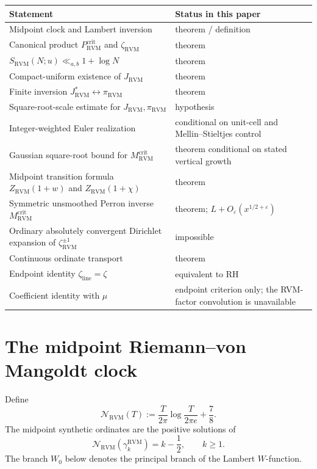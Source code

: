 \documentclass[11pt,reqno]{amsart}
\theoremstyle{definition}
\theoremstyle{remark}
\newcommand{\RVM}{\mathrm{RVM}}
\newcommand{\crit}{\mathrm{crit}}
\newcommand{\linez}{\mathrm{line}}
\begin{document}
\begin{center}
\begin{tabular}{p{}p{}}
\toprule
Statement & Status in this paper\\
\midrule
Midpoint clock and Lambert inversion & theorem / definition\\
Canonical product $P_{\RVM}^{\crit}$ and $\zeta_{\RVM}$ & theorem\\
$S_{\RVM}(N;u)\ll_{a,b}1+\log N$ & theorem\\
Compact-uniform existence of $J_{\RVM}$ & theorem\\
Finite inversion $J_{\RVM}^{*}\leftrightarrow\pi_{\RVM}$ & theorem\\
Square-root-scale estimate for $J_{\RVM},\pi_{\RVM}$ & hypothesis\\
Integer-weighted Euler realization & conditional on unit-cell and Mellin--Stieltjes control\\
Gaussian square-root bound for $M_{\RVM}^{\crit}$ & theorem conditional on stated vertical growth\\
Midpoint transition formula $Z_{\RVM}(1+w)$ and $Z_{\RVM}(1+\chi)$ & theorem\\
Symmetric unsmoothed Perron inverse $M_{\RVM}^{\crit}$ & theorem; $L+O_\varepsilon(x^{1/2+\varepsilon})$\\
Ordinary absolutely convergent Dirichlet expansion of $\zeta_{\RVM}^{\pm1}$ & impossible\\
Continuous ordinate transport & theorem\\
Endpoint identity $\zeta_{\linez}=\zeta$ & equivalent to RH\\
Coefficient identity with $\mu$ & endpoint criterion only; the RVM-factor convolution is unavailable\\
\bottomrule
\end{tabular}
\end{center}

\section{The midpoint Riemann--von Mangoldt clock}

Define
\begin{equation}\label{eq:clock}
 \mathcal N_{\RVM}(T)
 :=\frac{T}{2\pi}\log\frac{T}{2\pi e}+\frac78.
\end{equation}
The midpoint synthetic ordinates are the positive solutions of
\begin{equation}\label{eq:midpoint-condition}
 \mathcal N_{\RVM}(\gamma_k^{\RVM})=k-\frac12,
 \qquad k\ge1.
\end{equation}
The branch $W_0$ below denotes the principal branch of the Lambert $W$-function.
\end{document}
